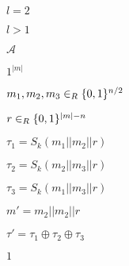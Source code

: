 \documentclass[10pt]{book}
\begin{document}
\begin{mdSnippets}
\begin{mdInlineSnippet}[49bc14c646fcf4ea55e76fc8752609f1]%
$l = 2$\end{mdInlineSnippet}%
\begin{mdInlineSnippet}[4044c65b1b50d7b6189eb36a6137f379]%
$l > 1$\end{mdInlineSnippet}%
\begin{mdInlineSnippet}[ad70146b431bea9ae74cf8385470c544]%
$\mathcal{A}$\end{mdInlineSnippet}%
\begin{mdInlineSnippet}%
$1^{|m|}$\end{mdInlineSnippet}%
\begin{mdInlineSnippet}%
$m_1,m_2,m_3 \in_R \{0,1\}^{n/2}$\end{mdInlineSnippet}%
\begin{mdInlineSnippet}[7a72520fcba0e5845c23a63f6b782b60]%
$r \in_R \{0,1\}^{|m| - n}$\end{mdInlineSnippet}%
\begin{mdInlineSnippet}[c81bbf1437a6a9fb05fd61ab8d08f5cf]%
$\tau_1 = S_k(m_1 || m_2 || r)$\end{mdInlineSnippet}%
\begin{mdInlineSnippet}[de49730e55d2ec2197b2ac09b9b4186c]%
$\tau_2 = S_k(m_2 || m_3|| r)$\end{mdInlineSnippet}%
\begin{mdInlineSnippet}[9d65d94016b8ad7e8850aa3ac62f428c]%
$\tau_3 = S_k(m_1 || m_3 || r)$\end{mdInlineSnippet}%
\begin{mdInlineSnippet}%
$m' = m_2 || m_2|| r$\end{mdInlineSnippet}%
\begin{mdInlineSnippet}[136255e19f3c1286e0fb73cff6b807b5]%
$\tau '= \tau_1 \oplus \tau_2 \oplus \tau_3$\end{mdInlineSnippet}%
\begin{mdInlineSnippet}[c4ca4238a0b923820dcc509a6f75849b]%
$1$\end{mdInlineSnippet}%
\begin{mdInlineSnippet}[1308b5bbd05f0c682089a3bd8a89617f]%

\end{mdInlineSnippet}
\end{mdSnippets}
\end{document}
